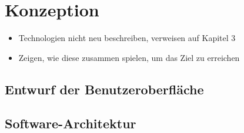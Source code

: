 \chapter{Konzeption}\label{konzeption}

\blindtext[1]

\begin{itemize}
\tightlist
\item
  Technologien nicht neu beschreiben, verweisen auf Kapitel 3
\item
  Zeigen, wie diese zusammen spielen, um das Ziel zu erreichen
\end{itemize}

\section{Entwurf der
Benutzeroberfläche}\label{entwurf-der-benutzeroberfluxe4che}

\section{Software-Architektur}\label{software-architektur}

